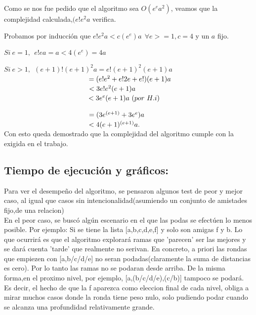 \documentclass[10pt, a4paper]{article}
\begin{document}
Como se nos fue pedido que el algoritmo sea $ O(e^{e}a^{2})$, veamos que la complejidad calculada,$(e!e^{2}a$ verifica.


Probamos por inducción que $e!e^{2}a < c(e^e)a \ \ \forall e >=1 , c = 4 $ y un $a$ fijo.

$Si \  e = 1,\ \  e!ea = a < 4(e^{e})=4a$

$Si \  e > 1, \ \  (e+1)!(e+1)^{2}a = e!(e+1)^{2}(e+1)a $\\

$\hspace{43mm} = (e!e^{2} + e!2e + e!)(e+1)a $\\

$\hspace{43mm} < 3e!e^{2}(e+1)a$\\

$\hspace{43mm}< 3e^{e}(e+1)a \ (por \  H.i) \ \\$

$\hspace{43mm} = (3e^{(e+1)} + 3e^{e})a $\\

$\hspace{43mm} < 4(e+1)^{(e+1)}a.$\\


Con esto queda demostrado que la complejidad del algoritmo cumple con la exigida en el trabajo.

\subsection{Tiempo de ejecución y gráficos:}

Para ver el desempeño del algoritmo, se pensaron algunos test de peor y mejor caso, al igual que casos sin intencionalidad(asumiendo un conjunto de amistades fijo,de una relacion)
\\En el peor caso, se buscó algún escenario en el que las podas se efectúen lo menos posible.
Por ejemplo: Si se tiene la lista [a,b,c,d,e,f] y solo son amigas f y b. Lo que ocurrirá es que el algoritmo explorará ramas que 'parecen' ser las mejores y se dará cuenta 'tarde' que realmente no serivan. En concreto, a priori las rondas que empiezen con [a,b/c/d/e] no seran podadas(claramente la suma de distancias es cero). Por lo tanto las ramas no se podaran desde arriba. De la misma forma,en el proximo nivel, por ejemplo, [a,(b/c/d/e),(c/b)] tampoco se podará. Es decir, el hecho de que la f aparezca como eleccion final de cada nivel, obliga a mirar muchos casos donde la ronda tiene peso nulo, solo pudiendo podar cuando se alcanza una profundidad relativamente grande.\\
\end{document}

